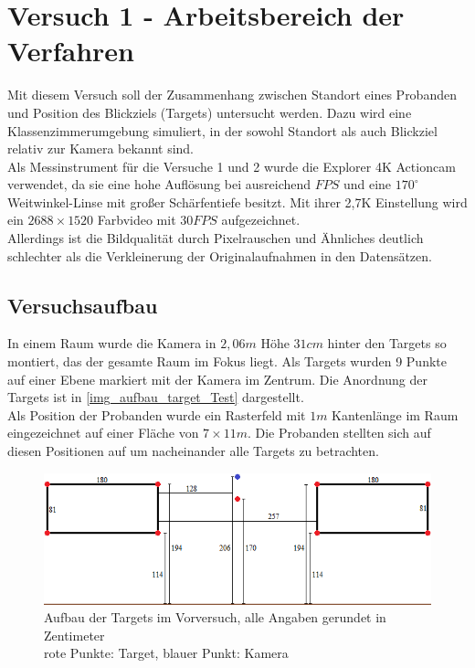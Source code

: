 \section{Versuch 1 - Arbeitsbereich der Verfahren}
\label{Versuch_1}
Mit diesem Versuch soll der Zusammenhang zwischen Standort eines Probanden und Position des Blickziels (Targets) untersucht werden. Dazu wird eine Klassenzimmerumgebung simuliert, in der sowohl Standort als auch Blickziel relativ zur Kamera bekannt sind.\\
Als Messinstrument für die Versuche 1 und 2 wurde die Explorer 4K Actioncam verwendet, da sie eine hohe Auflösung bei ausreichend $FPS$ und eine $170^\circ$ Weitwinkel-Linse mit großer Schärfentiefe besitzt. Mit ihrer 2,7K Einstellung wird ein $2688 \times 1520$ Farbvideo mit $30FPS$ aufgezeichnet.\\
Allerdings ist die Bildqualität durch Pixelrauschen und Ähnliches deutlich schlechter als die Verkleinerung der Originalaufnahmen in den Datensätzen.
\subsection{Versuchsaufbau}
In einem Raum wurde die Kamera in $2,06m$ Höhe $31cm$ hinter den Targets so montiert, das der gesamte Raum im Fokus liegt. Als Targets wurden 9 Punkte auf einer Ebene markiert mit der Kamera im Zentrum. Die Anordnung der Targets ist in \autoref{img_aufbau_target_Test} dargestellt.\\
Als Position der Probanden wurde ein Rasterfeld mit $1m$ Kantenlänge im Raum eingezeichnet auf einer Fläche von $7 \times 11m$. Die Probanden stellten sich auf diesen Positionen auf um nacheinander alle Targets zu betrachten. 
\begin{figure}
	\centering
	\includegraphics[width=0.7\linewidth]{img/Target}
	\caption{Aufbau der Targets im Vorversuch, alle Angaben gerundet in Zentimeter\\rote Punkte: Target, blauer Punkt: Kamera}
	\label{img_aufbau_target_Test}
\end{figure}
